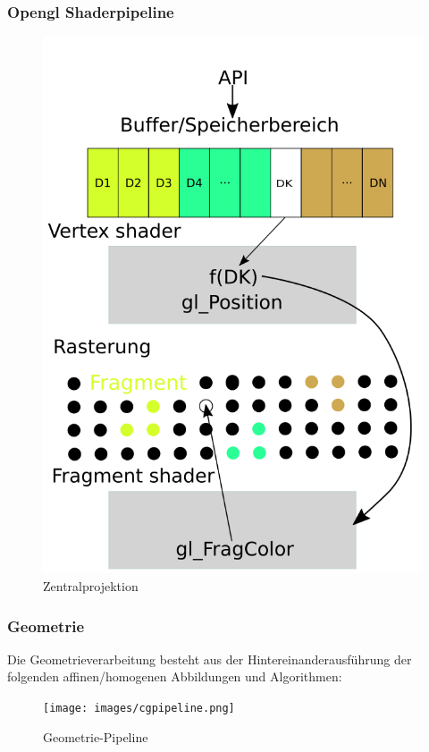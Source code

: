 \subsubsection{Opengl Shaderpipeline}
\begin{figure}[H]
	\centering
	\includegraphics[width=1.0\textwidth]{images/Zeichnung_Shaderpipeline.png}
	\caption{Zentralprojektion}
	\label{fig:projection-sight-vol}
\end{figure}


\subsubsection{Geometrie}
Die Geometrieverarbeitung   besteht aus der Hintereinanderausführung der folgenden affinen/homogenen Abbildungen und Algorithmen:
\begin{figure}[H]
    \centering
    \texttt{[image: images/cgpipeline.png]}
    \caption{Geometrie-Pipeline}
    \label{fig:cgpipeline-geometry}
\end{figure}

